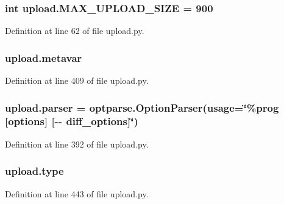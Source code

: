 \subsubsection[{\texorpdfstring{M\+A\+X\+\_\+\+U\+P\+L\+O\+A\+D\+\_\+\+S\+I\+ZE}{MAX_UPLOAD_SIZE}}]{\setlength{\rightskip}{0pt plus 5cm}int upload.\+M\+A\+X\+\_\+\+U\+P\+L\+O\+A\+D\+\_\+\+S\+I\+ZE = 900}\hypertarget{namespaceupload_aad5b1a43823e2a710a2f78e33dde8901}{}\label{namespaceupload_aad5b1a43823e2a710a2f78e33dde8901}


Definition at line 62 of file upload.\+py.

\subsubsection[{\texorpdfstring{metavar}{metavar}}]{\setlength{\rightskip}{0pt plus 5cm}upload.\+metavar}\hypertarget{namespaceupload_af1cea8af5389f0ab2d8b65b2c0fd2fe0}{}\label{namespaceupload_af1cea8af5389f0ab2d8b65b2c0fd2fe0}


Definition at line 409 of file upload.\+py.

\subsubsection[{\texorpdfstring{parser}{parser}}]{\setlength{\rightskip}{0pt plus 5cm}upload.\+parser = optparse.\+Option\+Parser(usage=\char`\"{}\%prog \mbox{[}options\mbox{]} \mbox{[}-\/-\/ diff\+\_\+options\mbox{]}\char`\"{})}\hypertarget{namespaceupload_af9e508d19dc2dd9cdb7c642dde0bdd21}{}\label{namespaceupload_af9e508d19dc2dd9cdb7c642dde0bdd21}


Definition at line 392 of file upload.\+py.

\subsubsection[{\texorpdfstring{type}{type}}]{\setlength{\rightskip}{0pt plus 5cm}upload.\+type}\hypertarget{namespaceupload_a4fc56f0dd6613be15c3c4dc3af3619ce}{}\label{namespaceupload_a4fc56f0dd6613be15c3c4dc3af3619ce}


Definition at line 443 of file upload.\+py.

